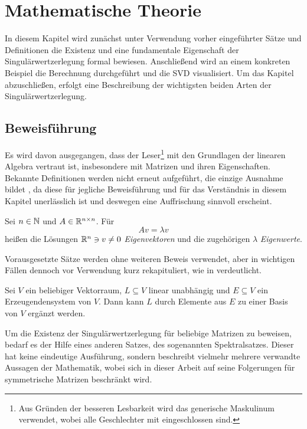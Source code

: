 \chapter{Mathematische Theorie}

In diesem Kapitel wird zunächst unter Verwendung vorher eingeführter Sätze und Definitionen die Existenz und eine fundamentale Eigenschaft der Singulärwertzerlegung formal bewiesen.
Anschließend wird an einem konkreten Beispiel die Berechnung durchgeführt und die SVD visualisiert.
Um das Kapitel abzuschließen, erfolgt eine Beschreibung der wichtigsten beiden Arten der Singulärwertzerlegung.
\section{Beweisführung}
Es wird davon ausgegangen, dass der Leser\footnote{Aus Gründen der besseren Lesbarkeit wird das generische Maskulinum verwendet, wobei alle Geschlechter mit eingeschlossen sind.} mit den Grundlagen der linearen Algebra vertraut ist, insbesondere mit Matrizen und ihren Eigenschaften.
Bekannte Definitionen werden nicht erneut aufgeführt, die einzige Ausnahme bildet , da diese für jegliche Beweisführung und für das Verständnis in diesem Kapitel unerlässlich ist und deswegen eine Auffrischung sinnvoll erscheint.
\begin{definition}\label{eigvec}
    Sei \(n \in \mathbb{N}\) und \(A \in \mathbb{R}^{n \times n}\). Für
    \begin{equation*}
        Av=\lambda v
    \end{equation*}
    heißen die Lösungen \(\mathbb{R}^{n} \ni v \neq 0\) \textit{Eigenvektoren} und die zugehörigen \(\lambda\) \textit{Eigenwerte}.   
\end{definition}
Vorausgesetzte Sätze werden ohne weiteren Beweis verwendet, aber in wichtigen Fällen dennoch vor Verwendung kurz rekapituliert, wie in  verdeutlicht.
\begin{repitition}[Basisergänzungssatz]\label{bes}
    Sei \(V\) ein beliebiger Vektorraum, \(L \subseteq V\) linear unabhängig und \(E \subseteq V\) ein Erzeugendensystem von \(V\). Dann kann \(L\) durch Elemente aus \(E\) zu einer Basis von \(V\) ergänzt werden.
\end{repitition}
Um die Existenz der Singulärwertzerlegung für beliebige Matrizen zu beweisen, bedarf es der Hilfe eines anderen Satzes, des sogenannten Spektralsatzes.
Dieser hat keine eindeutige Ausführung, sondern beschreibt vielmehr mehrere verwandte Aussagen der Mathematik, wobei sich in dieser Arbeit auf seine Folgerungen für symmetrische Matrizen beschränkt wird.

